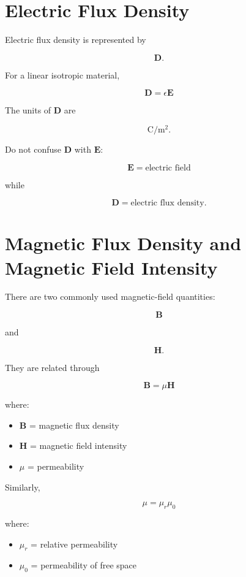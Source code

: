 \documentclass[11pt]{article}
\newcommand{\vect}[1]{\mathbf{#1}}
\begin{document}
\section{Electric Flux Density}

Electric flux density is represented by

\[
\vect{D}.
\]

For a linear isotropic material,

\[
\boxed{
\vect{D}
=
\epsilon\vect{E}
}
\]

The units of $\vect{D}$ are

\[
\mathrm{C/m^2}.
\]

Do not confuse $\vect{D}$ with $\vect{E}$:

\[
\vect{E}
=
\text{electric field}
\]

while

\[
\vect{D}
=
\text{electric flux density}.
\]



\section{Magnetic Flux Density and Magnetic Field Intensity}

There are two commonly used magnetic-field quantities:

\[
\vect{B}
\]

and

\[
\vect{H}.
\]

They are related through

\[
\boxed{
\vect{B}
=
\mu\vect{H}
}
\]

where:

\begin{itemize}
    \item $\vect{B}$ = magnetic flux density
    \item $\vect{H}$ = magnetic field intensity
    \item $\mu$ = permeability
\end{itemize}

Similarly,

\[
\boxed{
\mu
=
\mu_r\mu_0
}
\]

where:

\begin{itemize}
    \item $\mu_r$ = relative permeability
    \item $\mu_0$ = permeability of free space
\end{itemize}
\end{document}
